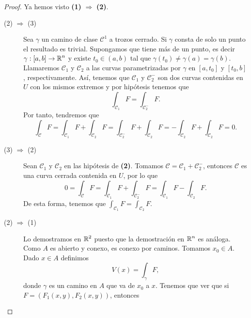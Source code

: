 \begin{proof}
Ya hemos visto \textbf{(1)} $\displaystyle \Rightarrow $ \textbf{(2)}. 
\begin{description}
	\item[(2) $\displaystyle \Rightarrow $ (3)] Sea $\displaystyle \gamma  $ un camino de clase $\displaystyle \mathcal{C}^{1} $ a trozos cerrado. Si $\displaystyle \gamma  $ consta de solo un punto el resultado es trivial. Supongamos que tiene más de un punto, es decir $\displaystyle \gamma:\left[a,b\right] \to \mathbb{R}^{n} $ y existe $\displaystyle t_{0}\in\left(a,b\right) $ tal que $\displaystyle \gamma\left(t_{0}\right)\neq \gamma\left(a\right)=\gamma\left(b\right) $. Llamaremos $\displaystyle \mathcal{C}_{1} $ y $\displaystyle \mathcal{C_{2}} $ a las curvas parametrizadas por $\displaystyle \gamma  $ en $\displaystyle \left[a,t_{0}\right]  $ y $\displaystyle \left[t_{0}, b\right]  $, respectivamente. 
		Así, tenemos que $\displaystyle \mathcal{C}_{1} $ y $\displaystyle \mathcal{C}_{2}^{-} $ son dos curvas contenidas en $\displaystyle U $ con los mismos extremos y por hipótesis tenemos que
		\[\int _{\mathcal{C}_{1}}F =\int _{\mathcal{C}_{2}^{-}}F  .\]
		Por tanto, tendremos que 
		\[\int _{\mathcal{C}}F =\int _{\mathcal{C}_{1}}F +\int _{\mathcal{C}_{2}}F =\int _{\mathcal{C}_{2}^{-}}F +\int _{\mathcal{C}_{2}}F = -\int _{\mathcal{C}_{2}}F +\int _{\mathcal{C}_{2}}F =0 .\]
	\item[(3) $\displaystyle \Rightarrow $ (2)] Sean $\displaystyle \mathcal{C}_{1} $ y $\displaystyle \mathcal{C}_{2} $ en las hipótesis de \textbf{(2)}. Tomamos $\displaystyle \mathcal{C}=\mathcal{C}_{1}+\mathcal{C}_{2}^{-} $, entonces $\displaystyle \mathcal{C} $ es una curva cerrada contenida en $\displaystyle U $, por lo que 
		\[0 = \int _{\mathcal{C}}F =\int _{\mathcal{C}_{1}}F +\int _{\mathcal{C}_{2}^{-}}F =\int _{\mathcal{C}_{1}}F -\int _{\mathcal{C}_{2}}F .\]
		De esta forma, tenemos que $\displaystyle \int _{\mathcal{C}_{1}}F =\int _{\mathcal{C}_{2}}F $. 
	\item[(2) $\displaystyle \Rightarrow $ (1)] Lo demostramos en $\displaystyle \mathbb{R}^{2} $ puesto que la demostración en $\displaystyle \mathbb{R}^{n} $ es análoga. Como $\displaystyle A $ es abierto y conexo, es conexo por caminos. Tomamos $\displaystyle x_{0} \in A $. Dado $\displaystyle x \in A $ definimos 
	\[V\left(x\right)=\int _{\gamma }F  ,\]
	donde $\displaystyle \gamma  $ es un camino en $\displaystyle A $ que va de $\displaystyle x_{0} $ a $\displaystyle x $. Tenemos que ver que si $\displaystyle F = \left(F_{1}\left(x,y\right), F_{2}\left(x,y\right)\right) $, entonces

\end{description}
\end{proof}
